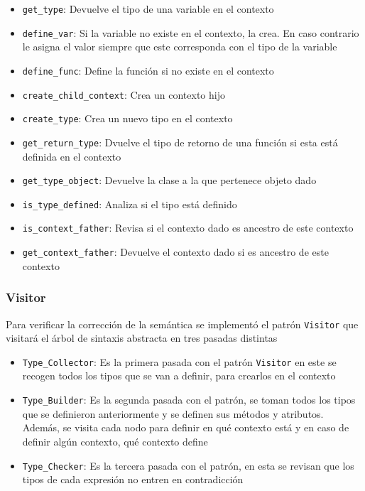 \begin{itemize}
\begin{itemize}
	\item \verb|get_type|: Devuelve el tipo de una variable en el contexto
	
	\item \verb|define_var|: Si la variable no existe en el contexto, la crea. En caso contrario le asigna el valor siempre que este corresponda con el tipo de la variable
	
	\item \verb|define_func|: Define la funci\'on si no existe en el contexto
	
	\item \verb|create_child_context|: Crea un contexto hijo
	
	\item \verb|create_type|: Crea un nuevo tipo en el contexto
	
	\item \verb|get_return_type|: Dvuelve el tipo de retorno de una funci\'on si esta est\'a definida en el contexto
	
	\item \verb|get_type_object|: Devuelve la clase a la que pertenece objeto dado 
	
	\item \verb|is_type_defined|: Analiza si el tipo est\'a definido
	
	\item \verb|is_context_father|: Revisa si el contexto dado es ancestro de este contexto
	
	\item \verb|get_context_father|: Devuelve el contexto dado si es ancestro de este contexto
	
\end{itemize}

\end{itemize}

\subsubsection{Visitor}
Para verificar la correcci\'on de la sem\'antica se implement\'o el patr\'on \verb|Visitor| que visitar\'a el \'arbol de sintaxis abstracta en tres pasadas distintas
\begin{itemize}
\item \verb|Type_Collector|: Es la primera pasada con el patr\'on \verb|Visitor| en este se recogen todos los tipos que se van a definir, para crearlos en el contexto

\item \verb|Type_Builder|: Es la segunda pasada con el patr\'on, se toman todos los tipos que se definieron anteriormente y se definen sus m\'etodos y atributos. Adem\'as, se visita cada nodo para definir en qu\'e contexto est\'a y en caso de definir alg\'un contexto, qu\'e contexto define

\item \verb|Type_Checker|: Es la tercera pasada con el patr\'on, en esta se revisan que los tipos de cada expresi\'on no entren en contradicci\'on
\end{itemize}

